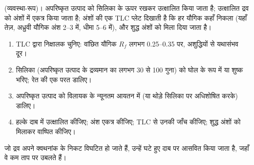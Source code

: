 \begin{omfigure}
\par\vspace{4pt}

{\small {} (व्यवस्था-रूप)। अपरिष्कृत उत्पाद को सिलिका के ऊपर रखकर उत्क्षालित किया जाता है;
उत्क्षालित द्रव को अंशों में एकत्र किया जाता है; अंशों की एक TLC प्लेट दिखाती है कि हर यौगिक कहाँ निकला
(यहाँ तेज़, अध्रुवी यौगिक अंश 2--3 में, धीमा 5--6 में), और शुद्ध अंशों को
मिला दिया जाता है।}
\end{omfigure}

\begin{method}[फ़्लैश स्तंभ चलाना]\label{met:b2:lab-techniques-2:flash}
\begin{enumerate}
  \item TLC द्वारा निक्षालक चुनिए: वांछित यौगिक $R_f$ लगभग 0.25--0.35 पर, अशुद्धियों से यथासंभव
        दूर।
  \item सिलिका (अपरिष्कृत उत्पाद के द्रव्यमान का लगभग 30 से 100 गुना) को घोल के रूप में या शुष्क भरिए; रेत की एक परत
        डालिए।
  \item अपरिष्कृत उत्पाद को विलायक के न्यूनतम आयतन में (या थोड़े सिलिका पर अधिशोषित करके) डालिए।
  \item हल्के दाब में उत्क्षालित कीजिए; अंश एकत्र कीजिए; TLC से उनकी जाँच कीजिए; शुद्ध अंशों को मिलाकर
        वाष्पित कीजिए।
\end{enumerate}
\end{method}

जो द्रव अपने क्वथनांक के निकट विघटित हो जाते हैं, उन्हें घटे हुए दाब पर आसवित किया जाता है, जहाँ वे
कम ताप पर उबलते हैं।

